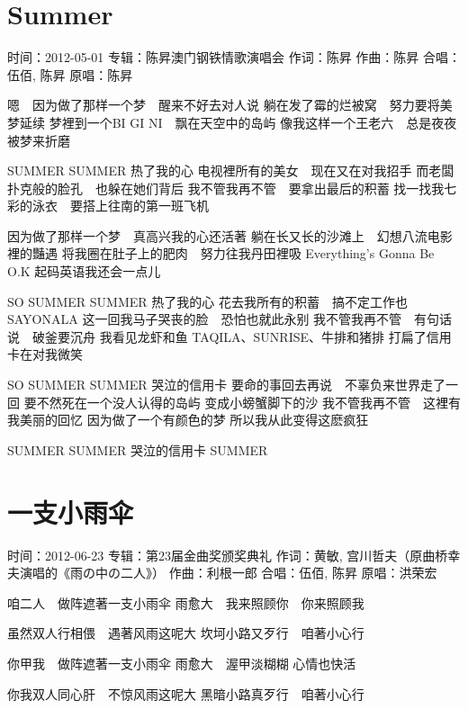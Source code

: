 \documentclass[UTF8,a4paper,oneside,twocolumn,12pt]{ctexbook}
\newcommand{\infopair}[2]{\textbullet #1：#2}
\newcommand{\zc}[1][伍佰]{\infopair{作词}{#1}}
\newcommand{\zq}[1][伍佰]{\infopair{作曲}{#1}}
\newcommand{\zj}[1]{\infopair{专辑}{#1}}
\newcommand{\yc}[1]{\infopair{原唱}{#1}}
\newcommand{\sj}[1]{\infopair{时间}{#1}}
\newenvironment{info}{\begin{flushleft}\kaishu
	}
	{\end{flushleft}\normalsize\yahei\par}
\newenvironment{lyric}{
	}
{}
\begin{document}
\section{Summer}%
\begin{info}
	\sj{2012-05-01}
	\zj{陈昇澳门钢铁情歌演唱会}
	\zc[陈昇]
	\zq[陈昇]
	\infopair{合唱}{伍佰, 陈昇}
	\yc{陈昇}
\end{info}
\begin{lyric}
	嗯　因为做了那样一个梦　醒来不好去对人说
	躺在发了霉的烂被窝　努力要将美梦延续
	梦裡到一个BI GI NI　飘在天空中的岛屿
	像我这样一个王老六　总是夜夜被梦来折磨

	SUMMER SUMMER 热了我的心
	电视裡所有的美女　现在又在对我招手
	而老闆扑克般的脸孔　也躲在她们背后
	我不管我再不管　要拿出最后的积蓄
	找一找我七彩的泳衣　要搭上往南的第一班飞机

	因为做了那样一个梦　真高兴我的心还活著
	躺在长又长的沙滩上　幻想八流电影裡的豔遇
	将我圈在肚子上的肥肉　努力往我丹田裡吸
	Everything's Gonna Be O.K
	起码英语我还会一点儿

	SO SUMMER SUMMER 热了我的心
	花去我所有的积蓄　搞不定工作也 SAYONALA
	这一回我马子哭丧的脸　恐怕也就此永别
	我不管我再不管　有句话说　破釜要沉舟
	我看见龙虾和鱼 TAQILA、SUNRISE、牛排和猪排
	打扁了信用卡在对我微笑

	SO SUMMER SUMMER 哭泣的信用卡
	要命的事回去再说　不辜负来世界走了一回
	要不然死在一个没人认得的岛屿
	变成小螃蟹脚下的沙
	我不管我再不管　这裡有我美丽的回忆
	因为做了一个有颜色的梦
	所以我从此变得这麽疯狂

	SUMMER
	SUMMER 哭泣的信用卡
	SUMMER
\end{lyric}

\section{一支小雨伞}%
\begin{info}
	\sj{2012-06-23}
	\zj{第23届金曲奖颁奖典礼}
	\zc[黄敏, 宫川哲夫（原曲桥幸夫演唱的《雨の中の二人》）]
	\zq[利根一郎]
	\infopair{合唱}{伍佰, 陈昇}
	\yc{洪荣宏}
\end{info}
\begin{lyric}%
	咱二人　做阵遮著一支小雨伞
	雨愈大　我来照顾你　你来照顾我

	虽然双人行相偎　遇著风雨这呢大
	坎坷小路又歹行　咱著小心行

	你甲我　做阵遮著一支小雨伞
	雨愈大　渥甲淡糊糊 心情也快活

	你我双人同心肝　不惊风雨这呢大
	黑暗小路真歹行　咱著小心行
\end{lyric}
\end{document}
